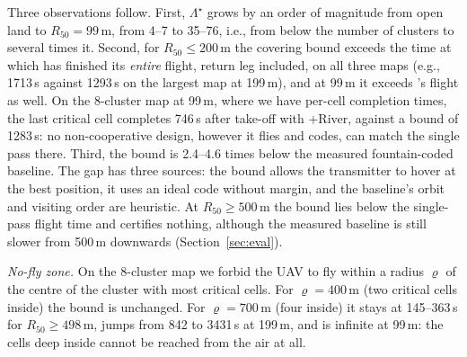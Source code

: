 Three observations follow. First, $\Lambda^\star$ grows by an order of magnitude from open land to $R_{50}=99$\,m, from
4--7 to 35--76, i.e., from below the number of clusters to several times it. Second, for $R_{50}\le200$\,m the covering
bound exceeds the time at which \lmtour{} has finished its \emph{entire} flight, return leg included, on all three maps
(e.g., 1713\,s against 1293\,s on the largest map at 199\,m), and at 99\,m it exceeds \chord's flight as well. On the
8-cluster map at 99\,m, where we have per-cell completion times, the last critical cell completes 746\,s after take-off
with \chord{}+River, against a bound of 1283\,s: no non-cooperative design, however it flies and codes, can match the
single pass there. Third, the bound is 2.4--4.6 times below the measured fountain-coded baseline. The gap has three
sources: the bound allows the transmitter to hover at the best position, it uses an ideal code without margin, and the
baseline's orbit and visiting order are heuristic. At $R_{50}\ge500$\,m the bound lies below the single-pass flight time
and certifies nothing, although the measured baseline is still slower from 500\,m downwards (Section~\ref{sec:eval}).

\emph{No-fly zone.} On the 8-cluster map we forbid the UAV to fly within a radius $\varrho$ of the centre of the cluster
with most critical cells. For $\varrho=400$\,m (two critical cells inside) the bound is unchanged. For $\varrho=700$\,m
(four inside) it stays at 145--363\,s for $R_{50}\ge498$\,m, jumps from 842 to 3431\,s at 199\,m, and is infinite at
99\,m: the cells deep inside cannot be reached from the air at all. 
